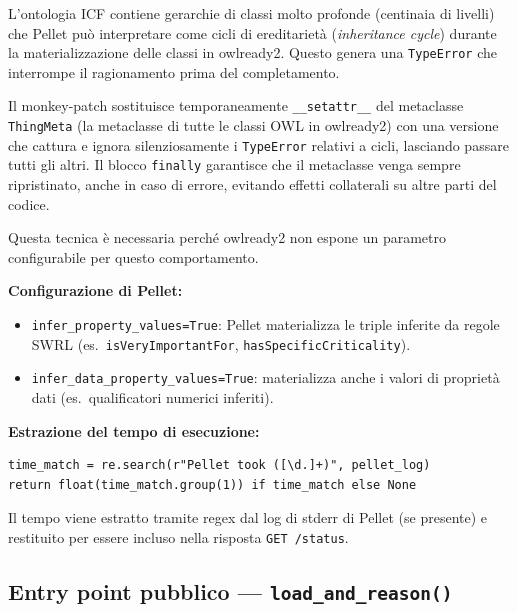\documentclass[a4paper,12pt]{article}
\begin{document}
\noindent \begin{infobox}
L'ontologia ICF contiene gerarchie di classi molto profonde (centinaia
di livelli) che Pellet pu\`{o} interpretare come cicli di ereditariet\`{a}
(\textit{inheritance cycle}) durante la materializzazione delle classi
in owlready2. Questo genera una \texttt{TypeError} che interrompe il
ragionamento prima del completamento.

Il monkey-patch sostituisce temporaneamente \texttt{\_\_setattr\_\_} del
metaclasse \texttt{ThingMeta} (la metaclasse di tutte le classi OWL in
owlready2) con una versione che cattura e ignora silenziosamente i
\texttt{TypeError} relativi a cicli, lasciando passare tutti gli altri.
Il blocco \texttt{finally} garantisce che il metaclasse venga sempre
ripristinato, anche in caso di errore, evitando effetti collaterali
su altre parti del codice.

Questa tecnica \`{e} necessaria perch\'{e} owlready2 non espone un
parametro configurabile per questo comportamento.
\end{infobox}

\textbf{Configurazione di Pellet:}
\begin{itemize}[noitemsep]
  \item \texttt{infer\_property\_values=True}: Pellet materializza le
        triple inferite da regole SWRL (es.\ \texttt{isVeryImportantFor},
        \texttt{hasSpecificCriticality}).
  \item \texttt{infer\_\allowbreak{}data\_\allowbreak{}property\_\allowbreak{}values=True}: materializza anche i
        valori di propriet\`{a} dati (es.\ qualificatori numerici inferiti).
\end{itemize}

\textbf{Estrazione del tempo di esecuzione:}
\begin{lstlisting}[caption={Parsing del tempo di esecuzione di Pellet dal log.}]
time_match = re.search(r"Pellet took ([\d.]+)", pellet_log)
return float(time_match.group(1)) if time_match else None
\end{lstlisting}

\noindent Il tempo viene estratto tramite regex dal log di stderr di Pellet
(se presente) e restituito per essere incluso nella risposta
\texttt{GET /status}.

\subsection{Entry point pubblico --- \texttt{load\_and\_reason()}}
\end{document}
